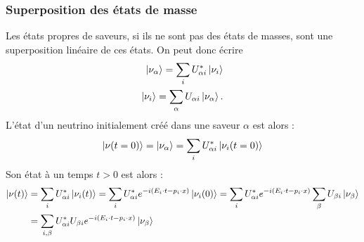       \subsubsection{Superposition des états de masse}
        Les états propres de saveurs, si ils ne sont pas des états de masses, sont une superposition linéaire de ces états. On peut donc écrire
        \begin{eqnarray}
          \ket{\nu_{\alpha}} = \sum_i U_{\alpha i}^*\ket{\nu_i} \label{eq::alphatoi} \\
          \ket{\nu_i} = \sum_{\alpha} U_{\alpha i}\ket{\nu_{\alpha}}.
        \end{eqnarray}
        L'état d'un neutrino initialement créé dans une saveur $\alpha$ est alors :
        \begin{equation}
          \ket{\nu(t=0)} = \ket{\nu_{\alpha}} = \sum_i U_{\alpha i}^*\ket{\nu_i(t=0)}
        \end{equation}
        Son état à un temps $t > 0$ est alors :
        \begin{equation}\label{eq::0tot}
          \begin{split}
            \ket{\nu(t)} &=\sum_{i} U_{\alpha i}^*\ket{\nu_i(t)} = \sum_{i} U_{\alpha i}^* e^{-i(E_i\cdot t - p_i\cdot x)}\ket{\nu_i(0)} = \sum_{i} U_{\alpha i}^* e^{-i(E_i\cdot t - p_i\cdot x)}\sum_{\beta}U_{\beta i}\ket{\nu_{\beta}}\\ & = \sum_{i,\beta} U_{\alpha i}^*U_{\beta i} e^{-i(E_i\cdot t - p_i\cdot x)}\ket{\nu_{\beta}}
          \end{split}
        \end{equation}

